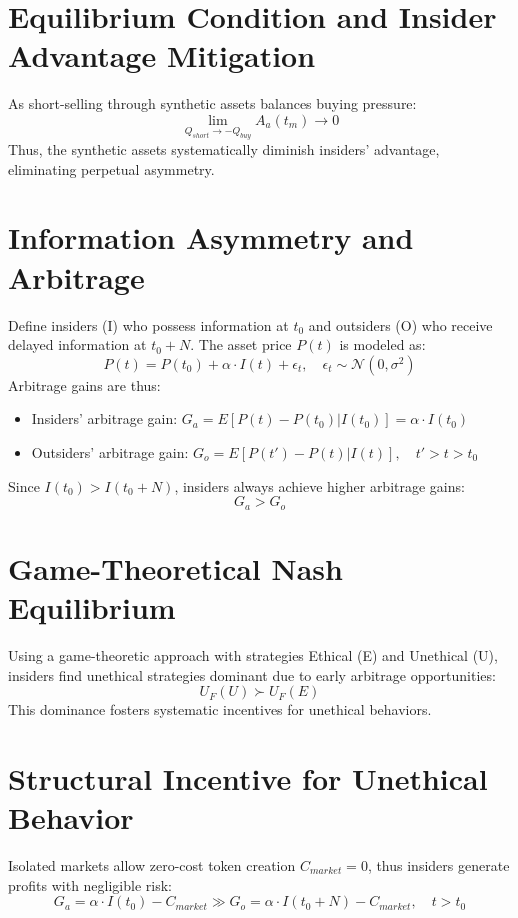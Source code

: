 \documentclass{article}
\begin{document}
\section{Equilibrium Condition and Insider Advantage Mitigation}

As short-selling through synthetic assets balances buying pressure:
\[
\lim_{Q_{short} \to -Q_{buy}} A_a(t_m) \to 0
\]
Thus, the synthetic assets systematically diminish insiders' advantage, eliminating perpetual asymmetry.

\section{Information Asymmetry and Arbitrage}

Define insiders (I) who possess information at $t_0$ and outsiders (O) who receive delayed information at $t_0 + N$. The asset price $P(t)$ is modeled as:
\[
P(t) = P(t_0) + \alpha \cdot I(t) + \epsilon_t, \quad \epsilon_t \sim \mathcal{N}(0, \sigma^2)
\]
Arbitrage gains are thus:
\begin{itemize}
    \item Insiders' arbitrage gain: $G_a = E[P(t) - P(t_0)|I(t_0)] = \alpha \cdot I(t_0)$
    \item Outsiders' arbitrage gain: $G_o = E[P(t') - P(t)|I(t)], \quad t' > t > t_0$
\end{itemize}
Since $I(t_0) > I(t_0 + N)$, insiders always achieve higher arbitrage gains:
\[
G_a > G_o
\]

\section{Game-Theoretical Nash Equilibrium}

Using a game-theoretic approach with strategies Ethical (E) and Unethical (U), insiders find unethical strategies dominant due to early arbitrage opportunities:
\[
U_F(U) \succ U_F(E)
\]
This dominance fosters systematic incentives for unethical behaviors.

\section{Structural Incentive for Unethical Behavior}

Isolated markets allow zero-cost token creation $C_{market} = 0$, thus insiders generate profits with negligible risk:
\[
G_a = \alpha \cdot I(t_0) - C_{market} \gg G_o = \alpha \cdot I(t_0 + N) - C_{market}, \quad t > t_0
\]
\end{document}
